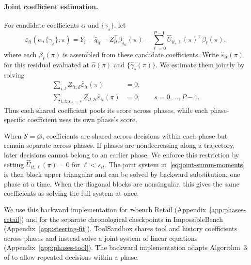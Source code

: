 \paragraph{Joint coefficient estimation.}
For candidate coefficients $\alpha$ and $\{\gamma_s\}$, let
\begin{equation}
 \varepsilon_{it}(\alpha,\{\gamma_s\};\pi)
   =Y_i-\widehat q_{it}-Z_{it}^\top\beta_{s_{it}}(\pi)
     -\sum_{\ell=0}^{P-1}\widehat U_{it,\ell}(\pi)^\top\beta_\ell(\pi),
 \label{eq:joint-snmm-residual}
\end{equation}
where each $\beta_\ell(\pi)$ is assembled from these candidate coefficients.
Write $\widehat\varepsilon_{it}(\pi)$ for this residual evaluated at
$\widehat\alpha(\pi)$ and $\{\widehat\gamma_s(\pi)\}$. We estimate them jointly
by solving
\begin{equation}
\begin{aligned}
 \sum_{i,t}Z_{it,\mathcal S}\widehat\varepsilon_{it}(\pi)&=0,\\
 \sum_{i,t:s_{it}=s}Z_{it,\mathcal U}\widehat\varepsilon_{it}(\pi)&=0,
    \qquad s=0,\ldots,P-1.
\end{aligned}
\label{eq:joint-snmm-moments}
\end{equation}
Thus each shared coefficient pools its score across phases, while each
phase-specific coefficient uses its own phase's score. 

When $\mathcal S=\varnothing$, coefficients are shared across decisions
within each phase but remain separate across phases. If phases are
nondecreasing along a trajectory, later decisions cannot belong to an
earlier phase. We enforce this restriction by setting
$\widehat U_{it,\ell}(\pi)=0$ for $\ell<s_{it}$. The joint system
in~\eqref{eq:joint-snmm-moments} is then block upper triangular and can
be solved by backward substitution, one phase at a time. When the
diagonal blocks are nonsingular, this gives the same coefficients as
solving the full system at once.

We use this backward implementation for $\tau$-bench Retail
(Appendix~\ref{app:phases-retail}) and for the separate chronological
checkpoints in ImpossibleBench (Appendix~\ref{app:steering-fit}).
ToolSandbox shares tool and history coefficients across phases and
instead solve a joint system of linear equations (Appendix~\ref{app:phases-tool}).
The backward implementation adapts Algorithm~3 of
\citet{lewis2021dynamic} to allow repeated decisions within a phase.

